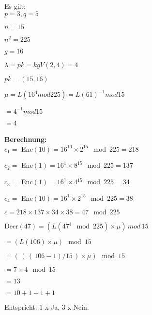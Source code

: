 \documentclass[a4paper]{article}
\begin{document}
Es gilt: \\

$	p = 3 , q = 5 $

$	n = 15$

$	n^2 = 225$

$	g = 16$

$	\lambda = pk =  kgV(2,4) = 4 $

$	pk = (15, 16)$

$	\mu = L(16^4 mod 225) = L(61)^{-1} mod 15$

$	= 4^{-1} mod 15$

$	= 4 $
\\
\\
\textbf{Berechnung:} \\

$c_1 = $ Enc$(10) = 16^{10} \times  2^{15} \mod 225 = 218$

$c_2 = $ Enc$(1) = 16^1 \times 8^{15} \mod 225 = 137$

$c_3 = $ Enc$(1) = 16^1 \times 4{^15} \mod 225 = 34$

$c_4 = $ Enc$(10) = 16^1 \times 2^{15} \mod 225 = 38$

$c = 218 \times 137 \times 34 \times 38 = 47 \mod 225$

Decr$(47) = ( L(47^4 \mod 225) \times \mu )\,  mod \, 15$

$= ( L(106) \times \mu ) \mod 15$ 

$=  (\, (\,(\,106 - 1)  /  15\,) \times \mu )\mod 15$

$= 7 \times 4 \mod 15 $

$= 13$

$= 10 + 1 + 1 + 1 $

Entspricht: 1 x Ja, 3 x Nein.  
	
\end{document}
